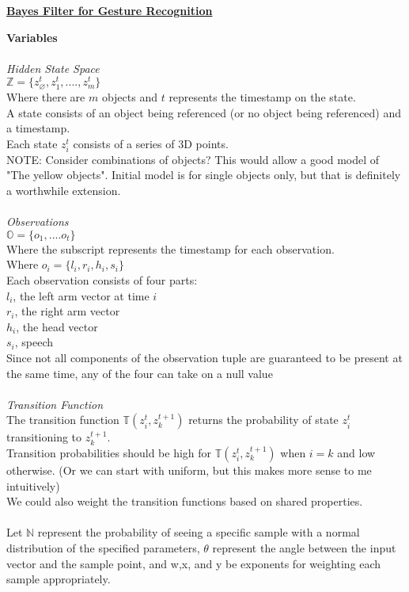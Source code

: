\documentclass[12pt,letterpaper]{article}
\begin{document}
\begin{center}\textbf{\underline{Bayes Filter for Gesture Recognition}}\end{center}
\textbf{Variables}\\\\
\textit{Hidden State Space}\\
$\mathbb{Z} = \{z^t_\varnothing, z^t_1, ...., z^t_m\}$\\
Where there are $m$ objects and $t$ represents the timestamp on the state.\\
A state consists of an object being referenced (or no object being referenced) and a timestamp.\\
Each state $z^t_i$ consists of a series of 3D points.\\
NOTE: Consider combinations of objects? This would allow a good model of "The yellow objects". Initial model is for single objects only, but that is definitely a worthwhile extension.\\\\
\textit{Observations}\\
$\mathbb{O} = \{o_1, .... o_t\}$\\
Where the subscript represents the timestamp for each observation.\\
Where $o_i= \{l_i,r_i, h_i, s_i\}$\\
Each observation consists of four parts:\\
$l_i$, the left arm vector at time $i$\\
$r_i$, the right arm vector\\
$h_i$, the head vector\\
$s_i$, speech\\
Since not all components of the observation tuple are guaranteed to be present at the same time, any of the four can take on a null value\\\\
\textit{Transition Function}\\
The transition function $\mathbb{T}(z^t_i, z^{t+1}_k)$ returns the probability of state $z^t_i$ transitioning to $z^{t+1}_k$.\\
Transition probabilities should be high for $\mathbb{T}(z_i^t,z^{t+1}_k)$ when $i=k$ and low otherwise. (Or we can start with uniform, but this makes more sense to me intuitively)\\
We could also weight the transition functions based on shared properties.\\\\
Let $\mathbb{N}$ represent the probability of seeing a specific sample with a  normal distribution of the specified parameters,  $\theta$ represent the angle between the input vector and the sample point, and w,x, and y be exponents for weighting each sample appropriately.\\\\
\end{document}

